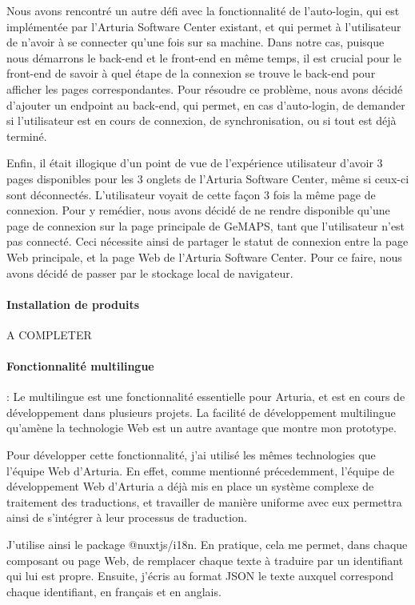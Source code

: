 \documentclass[francais]{rapportPFE}  %
\begin{document}
Nous avons rencontré un autre défi avec la fonctionnalité de l'auto-login, qui est implémentée par l'Arturia Software Center existant, et qui permet à l'utilisateur de n'avoir à se connecter qu'une fois sur sa machine. Dans notre cas, puisque nous démarrons le back-end et le front-end en même temps, il est crucial pour le front-end de savoir à quel étape de la connexion se trouve le back-end pour afficher les pages correspondantes. Pour résoudre ce problème, nous avons décidé d'ajouter un endpoint au back-end, qui permet, en cas d'auto-login, de demander si l'utilisateur est en cours de connexion, de synchronisation, ou si tout est déjà terminé.

Enfin, il était illogique d'un point de vue de l'expérience utilisateur d'avoir 3 pages disponibles pour les 3 onglets de l'Arturia Software Center, même si ceux-ci sont déconnectés. L'utilisateur voyait de cette façon 3 fois la même page de connexion. Pour y remédier, nous avons décidé de ne rendre disponible qu'une page de connexion sur la page principale de GeMAPS, tant que l'utilisateur n'est pas connecté. Ceci nécessite ainsi de partager le statut de connexion entre la page Web principale, et la page Web de l'Arturia Software Center. Pour ce faire, nous avons décidé de passer par le stockage local de navigateur. 


\paragraph{Installation de produits} A COMPLETER
\paragraph{Fonctionnalité multilingue}: Le multilingue est une fonctionnalité essentielle pour Arturia, et est en cours de développement dans plusieurs projets. La facilité de développement multilingue qu'amène la technologie Web est un autre avantage que montre mon prototype.

Pour développer cette fonctionnalité, j'ai utilisé les mêmes technologies que l'équipe Web d'Arturia. En effet, comme mentionné précedemment, l'équipe de développement Web d'Arturia a déjà mis en place un système complexe de traitement des traductions, et travailler de manière uniforme avec eux permettra ainsi de s'intégrer à leur processus de traduction. 

J'utilise ainsi le package @nuxtjs/i18n. En pratique, cela me permet, dans chaque composant ou page Web, de remplacer chaque texte à traduire par un identifiant qui lui est propre. Ensuite, j'écris au format JSON le texte auxquel correspond chaque identifiant, en français et en anglais.
\end{document}
